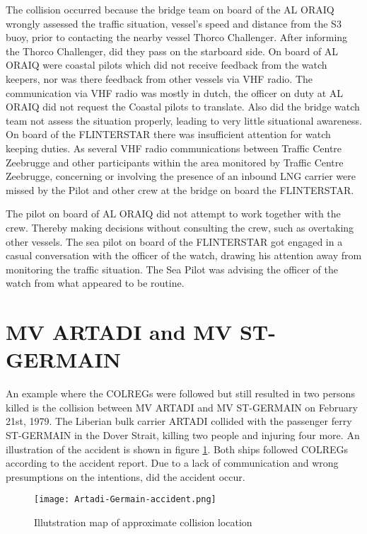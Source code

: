 The collision occurred because the bridge team on board of the AL ORAIQ wrongly assessed the traffic situation, vessel's speed and distance from the S3 buoy, prior to contacting the nearby vessel Thorco Challenger. After informing the Thorco Challenger, did they pass on the starboard side. On board of AL ORAIQ were coastal pilots which did not receive feedback from the watch keepers, nor was there feedback from other vessels via \ac{VHF} radio. The communication via VHF radio was mostly in dutch, the officer on duty at AL ORAIQ did not request the Coastal pilots to translate. Also did the bridge watch team not assess the situation properly, leading to very little situational awareness.
On board of the FLINTERSTAR there was insufficient attention for watch keeping duties. As several VHF radio communications between Traffic Centre Zeebrugge and other participants within the area monitored by Traffic Centre Zeebrugge, concerning or involving the presence of an inbound LNG carrier were missed by the Pilot and other crew at the bridge on board the FLINTERSTAR.

The pilot on board of AL ORAIQ did not attempt to work together with the crew. Thereby making decisions without consulting the crew, such as overtaking other vessels. 
The sea pilot on board of the FLINTERSTAR got engaged in a casual conversation with the officer of the watch, drawing his attention away from monitoring the traffic situation. The Sea Pilot was advising the officer of the watch from what appeared to be routine. \cite{Backer2015}

\newpage
\section{MV ARTADI and MV ST-GERMAIN}
\label{sec:artadiVSst-germain}
An example where the \ac{COLREGs} were followed but still resulted in two persons killed is the collision between MV ARTADI and MV ST-GERMAIN on February 21st, 1979. The Liberian bulk carrier ARTADI collided with the passenger ferry ST-GERMAIN in the Dover Strait, killing two people and injuring four more. An illustration of the accident is shown in figure \ref{fig:Artadi-Germain}. Both ships followed  \ac{COLREGs} according to the accident report. Due to a lack of communication and wrong presumptions on the intentions, did the accident occur.

\begin{figure}[H]
	\centering
	\texttt{[image: Artadi-Germain-accident.png]}
	\caption{Illutstration map of approximate collision location}
	\label{fig:Artadi-Germain}
\end{figure}

